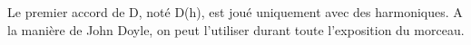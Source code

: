 
\tune

Le premier accord de D, noté D(h), est joué uniquement avec des
harmoniques. A la manière de John Doyle, on peut l'utiliser durant toute
l'exposition du morceau.